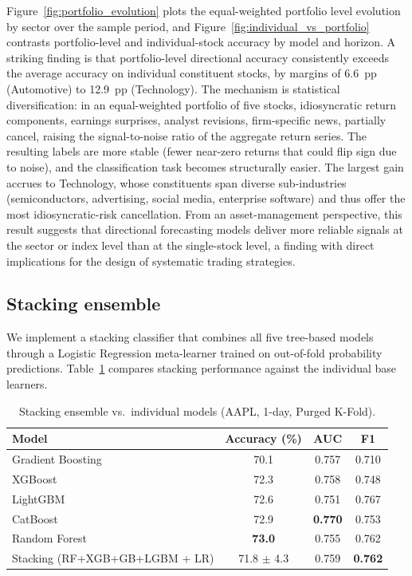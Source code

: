\documentclass{rQUF2e}
\begin{document}
\noindent Figure~\ref{fig:portfolio_evolution} plots the
equal-weighted portfolio level evolution by sector over the
sample period, and Figure~\ref{fig:individual_vs_portfolio}
contrasts portfolio-level and individual-stock accuracy by model
and horizon. A striking finding is that portfolio-level
directional accuracy consistently exceeds the average accuracy
on individual constituent stocks, by margins of 6.6~pp
(Automotive) to 12.9~pp (Technology). The mechanism is statistical diversification: in an equal-weighted portfolio of five stocks, idiosyncratic return components, earnings surprises, analyst revisions, firm-specific news, partially cancel, raising the signal-to-noise ratio of the aggregate return series. The resulting labels are more stable (fewer near-zero returns that could flip sign due to noise), and the classification task becomes structurally easier. The largest gain accrues to Technology, whose constituents span diverse sub-industries (semiconductors, advertising, social media, enterprise software) and thus offer the most idiosyncratic-risk cancellation. From an asset-management perspective, this result suggests that directional forecasting models deliver more reliable signals at the sector or index level than at the single-stock level, a finding with direct implications for the design of systematic trading strategies.

\subsection{Stacking ensemble}

We implement a stacking classifier that combines all five tree-based models through a Logistic Regression meta-learner trained on out-of-fold probability predictions. Table~\ref{tab:stacking} compares stacking performance against the individual base learners.

\begin{table}[H]
\centering
\caption{Stacking ensemble vs.\ individual models (AAPL, 1-day, Purged K-Fold).}
\scriptsize
\label{tab:stacking}
\begin{tabular}{lccc}
\toprule
\textbf{Model} & \textbf{Accuracy (\%)} & \textbf{AUC} & \textbf{F1} \\
\midrule
Gradient Boosting        & 70.1 & 0.757 & 0.710 \\
XGBoost                  & 72.3 & 0.758 & 0.748 \\
LightGBM                 & 72.6 & 0.751 & 0.767 \\
CatBoost                 & 72.9 & \textbf{0.770} & 0.753 \\
Random Forest            & \textbf{73.0} & 0.755 & 0.762 \\
\midrule
Stacking (RF+XGB+GB+LGBM + LR) & 71.8 $\pm$ 4.3 & 0.759 & \textbf{0.762} \\
\bottomrule
\end{tabular}
\end{table}
\end{document}
